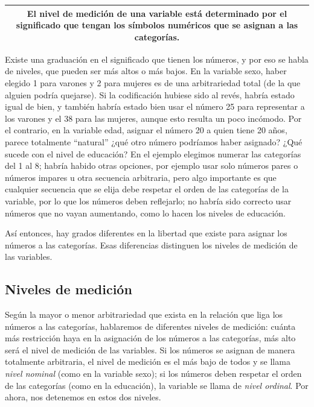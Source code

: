 \documentclass[]{book}
\begin{document}
\begin{longtable}[]{@{}c@{}}
\toprule
\endhead
\begin{minipage}[t]{0.97\columnwidth}\centering
El \textbf{nivel de medición} de una variable está determinado por el significado que tengan los símbolos numéricos que se asignan a las categorías.\strut
\end{minipage}\tabularnewline
\bottomrule
\end{longtable}

Existe una graduación en el significado que tienen los números, y por eso se habla de niveles, que pueden ser más altos o más bajos. En la variable sexo, haber elegido 1 para varones y 2 para mujeres es de una arbitrariedad total (de la que alguien podría quejarse). Si la codificación hubiese sido al revés, habría estado igual de bien, y también habría estado bien usar el número 25 para representar a los varones y el 38 para las mujeres, aunque esto resulta un poco incómodo. Por el contrario, en la variable edad, asignar el número 20 a quien tiene 20 años, parece totalmente ``natural'' ¿qué otro número podríamos haber asignado? ¿Qué sucede con el nivel de educación? En el ejemplo elegimos numerar las categorías del 1 al 8; habría habido otras opciones, por ejemplo usar solo números pares o números impares u otra secuencia arbitraria, pero algo importante es que cualquier secuencia que se elija debe respetar el orden de las categorías de la variable, por lo que los números deben reflejarlo; no habría sido correcto usar números que no vayan aumentando, como lo hacen los niveles de educación.

Así entonces, hay grados diferentes en la libertad que existe para asignar los números a las categorías. Esas diferencias distinguen los niveles de medición de las variables.

\hypertarget{niveles-de-mediciuxf3n}{%
\subsection{Niveles de medición}\label{niveles-de-mediciuxf3n}}

Según la mayor o menor arbitrariedad que exista en la relación que liga los números a las categorías, hablaremos de diferentes niveles de medición: cuánta más restricción haya en la asignación de los números a las categorías, más alto será el nivel de medición de las variables. Si los números se asignan de manera totalmente arbitraria, el nivel de medición es el más bajo de todos y se llama \emph{nivel nominal} (como en la variable sexo); si los números deben respetar el orden de las categorías (como en la educación), la variable se llama de \emph{nivel ordinal}. Por ahora, nos detenemos en estos dos niveles.
\end{document}
